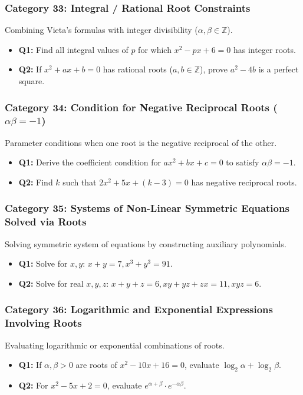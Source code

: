 \documentclass[10pt,a4paper]{article}
\begin{document}
\subsubsection{Category 33: Integral / Rational Root Constraints}
Combining Vieta's formulas with integer divisibility ($\alpha, \beta \in \mathbb{Z}$).
\begin{itemize}[leftmargin=*]
    \item \textbf{Q1:} Find all integral values of $p$ for which $x^2 - px + 6 = 0$ has integer roots.
    \item \textbf{Q2:} If $x^2 + ax + b = 0$ has rational roots ($a,b \in \mathbb{Z}$), prove $a^2 - 4b$ is a perfect square.
\end{itemize}

\subsubsection{Category 34: Condition for Negative Reciprocal Roots ($\alpha\beta = -1$)}
Parameter conditions when one root is the negative reciprocal of the other.
\begin{itemize}[leftmargin=*]
    \item \textbf{Q1:} Derive the coefficient condition for $ax^2 + bx + c = 0$ to satisfy $\alpha\beta = -1$.
    \item \textbf{Q2:} Find $k$ such that $2x^2 + 5x + (k-3) = 0$ has negative reciprocal roots.
\end{itemize}

\subsubsection{Category 35: Systems of Non-Linear Symmetric Equations Solved via Roots}
Solving symmetric system of equations by constructing auxiliary polynomials.
\begin{itemize}[leftmargin=*]
    \item \textbf{Q1:} Solve for $x, y$: $x + y = 7, x^3 + y^3 = 91$.
    \item \textbf{Q2:} Solve for real $x, y, z$: $x+y+z=6, xy+yz+zx=11, xyz=6$.
\end{itemize}

\subsubsection{Category 36: Logarithmic and Exponential Expressions Involving Roots}
Evaluating logarithmic or exponential combinations of roots.
\begin{itemize}[leftmargin=*]
    \item \textbf{Q1:} If $\alpha, \beta > 0$ are roots of $x^2 - 10x + 16 = 0$, evaluate $\log_2 \alpha + \log_2 \beta$.
    \item \textbf{Q2:} For $x^2 - 5x + 2 = 0$, evaluate $e^{\alpha+\beta} \cdot e^{-\alpha\beta}$.
\end{itemize}
\end{document}
